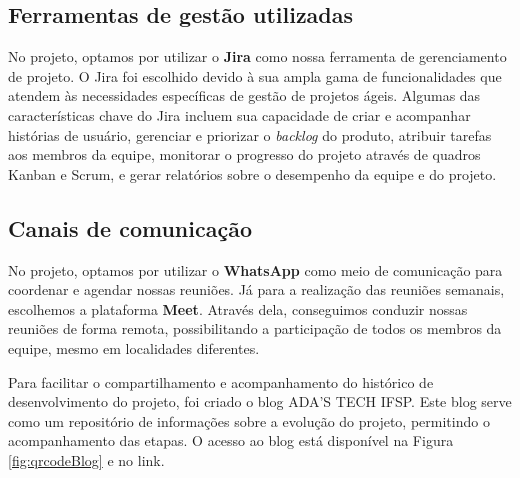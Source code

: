 \subsection{Ferramentas de gestão utilizadas}

No projeto, optamos por utilizar o \textbf{Jira} como nossa ferramenta de gerenciamento de projeto. O Jira foi escolhido devido à sua ampla gama de funcionalidades que atendem às necessidades específicas de gestão de projetos ágeis. Algumas das características chave do Jira incluem sua capacidade de criar e acompanhar histórias de usuário, gerenciar e priorizar o \textit{backlog} do produto, atribuir tarefas aos membros da equipe, monitorar o progresso do projeto através de quadros Kanban e Scrum, e gerar relatórios sobre o desempenho da equipe e do projeto.

\subsection{Canais de comunicação}

No projeto, optamos por utilizar o \textbf{WhatsApp} como meio de comunicação para coordenar e agendar nossas reuniões. Já para a realização das reuniões semanais, escolhemos a plataforma \textbf{Meet}. Através dela, conseguimos conduzir nossas reuniões de forma remota, possibilitando a participação de todos os membros da equipe, mesmo em localidades diferentes.

Para facilitar o compartilhamento e acompanhamento do histórico de desenvolvimento do projeto, foi criado o blog ADA'S TECH IFSP. Este blog serve como um repositório de informações sobre a evolução do projeto, permitindo o acompanhamento das etapas. O acesso ao blog está disponível na Figura \ref{fig:qrcodeBlog} e no link.



